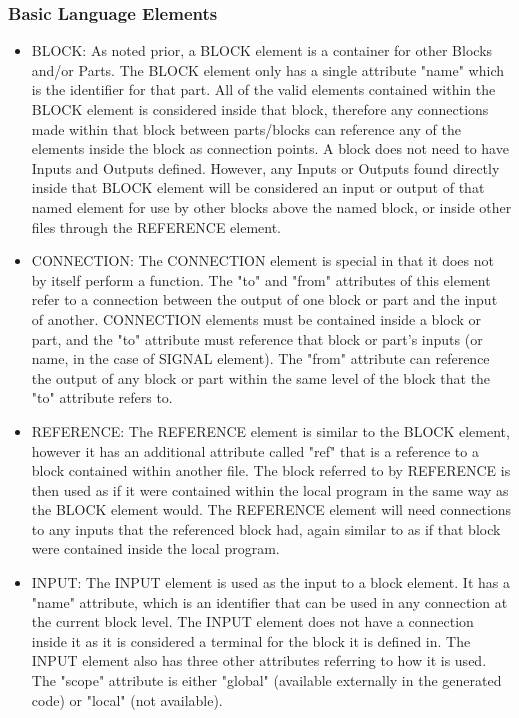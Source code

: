\subsubsection{Basic Language Elements}
\begin{itemize}[label={}]
    \item BLOCK:
As noted prior, a BLOCK element is a container for other Blocks and/or Parts.
The BLOCK element only has a single attribute "name" which is the identifier for that part.
All of the valid elements contained within the BLOCK element is considered inside that block, therefore any connections made within that block between parts/blocks can reference any of the elements inside the block as connection points. A block does not need to have Inputs and Outputs defined. However, any Inputs or Outputs found directly inside that BLOCK element will be considered an input or output of that named element for use by other blocks above the named block, or inside other files through the REFERENCE element.
    \item CONNECTION:
The CONNECTION element is special in that it does not by itself perform a function.
The "to" and "from" attributes of this element refer to a connection between the output of one block or part and the input of another.
CONNECTION elements must be contained inside a block or part, and the "to" attribute must reference that block or part's inputs (or name, in the case of SIGNAL element).
The "from" attribute can reference the output of any block or part within the same level of the block that the "to" attribute refers to.
    \item REFERENCE:
The REFERENCE element is similar to the BLOCK element, however it has an additional attribute called "ref" that is a reference to a block contained within another file.
The block referred to by REFERENCE is then used as if it were contained within the local program in the same way as the BLOCK element would.
The REFERENCE element will need connections to any inputs that the referenced block had, again similar to as if that block were contained inside the local program.
    \item INPUT:
The INPUT element is used as the input to a block element.
It has a "name" attribute, which is an identifier that can be used in any connection at the current block level.
The INPUT element does not have a connection inside it as it is considered a terminal for the block it is defined in.
The INPUT element also has three other attributes referring to how it is used.
The "scope" attribute is either "global" (available externally in the generated code) or "local" (not available).

\end{itemize}
